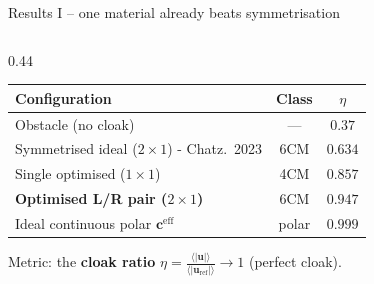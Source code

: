 \documentclass[aspectratio=169, 10pt]{beamer}
\newcommand{\mbf}[1]{\mathbf{#1}}
\newcommand{\Ceff}{\mbf{c}^{\mathrm{eff}}}
\newcommand{\uref}{\mbf{u}_{\mathrm{ref}}}
\begin{document}
\begin{frame}{Results I -- one material already beats symmetrisation}
  \begin{columns}[T]
    \begin{column}{0.44\textwidth}
      \centering\scriptsize

      \vspace{1.0em}

      \begin{tabular}{@{}lcc@{}}
        \toprule
        Configuration & Class & $\eta$ \\
        \midrule
        Obstacle (no cloak)                & ---   & $0.37$  \\
        Symmetrised ideal ($2\times1$) - Chatz.\ 2023   & 6CM   & $0.634$ \\
        Single optimised ($1\times1$) & 4CM & $\mathbf{0.857}$ \\
        \textbf{Optimised L/R pair ($2\times1$)}    & 6CM   & $0.947$ \\
        \midrule
        Ideal continuous polar $\Ceff$     & polar & $0.999$ \\
        \bottomrule
      \end{tabular}

    \vspace{2.5em}

    \begin{center}\small
      Metric: the \textbf{cloak ratio}\quad
      $\displaystyle \eta=\frac{\langle|\mbf{u}|\rangle}{\langle|\uref|\rangle}\to 1$
      \quad(perfect cloak).
    \end{center}


\end{column}
\end{columns}
\end{frame}
\end{document}
